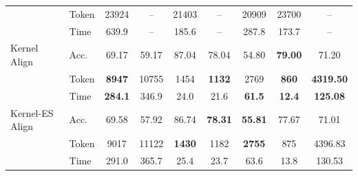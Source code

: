 \documentclass{article} %
\begin{document}
\begin{table}[t]
{{\begin{tabular}{@{}ll*{7}{c}@{}}
 & Token & 23924 & -- & 21403 & -- & 20909 & 23700 & -- \\
 & Time & 639.9 & -- & 185.6 & -- & 287.8 & 173.7 & -- \\
\midrule
Kernel Align & Acc. & 69.17 & 59.17 & 87.04 & 78.04 & 54.80 & \textbf{79.00} & 71.20 \\
 & Token & \textbf{8947} & 10755 & 1454 & \textbf{1132} & 2769 & \textbf{860} & \textbf{4319.50} \\
 & Time & \textbf{284.1} & 346.9 & 24.0 & 21.6 & \textbf{61.5} & \textbf{12.4} & \textbf{125.08} \\
\midrule
Kernel-ES Align & Acc. & 69.58 & 57.92 & 86.74 & \textbf{78.31} & \textbf{55.81} & 77.67 & 71.01 \\
 & Token & 9017 & 11122 & \textbf{1430} & 1182 & \textbf{2755} & 875 & 4396.83 \\
 & Time & 291.0 & 365.7 & 25.4 & 23.7 & 63.6 & 13.8 & 130.53 \\
\bottomrule
\end{tabular}%
}%
}
\end{table}
\end{document}

